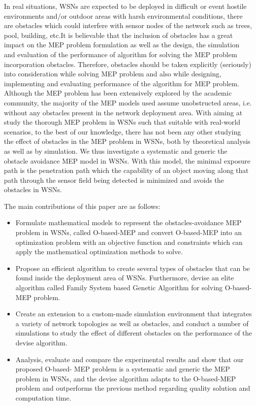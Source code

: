 \documentclass[final]{elsarticle}
\begin{document}
In real situations, WSNs are expected to be deployed in difficult or event hostile environments and/or outdoor areas with harsh environmental conditions, there are obstacles which could interfere with sensor nodes of the network such as trees, pool, building, etc.It is believable that the inclusion of obstacles has a great impact on the MEP problem formulation as well as the design, the simulation and evaluation of the performance of algorithm for solving the MEP problem incorporation obstacles. Therefore, obstacles should be taken explicitly (seriously) into consideration while solving MEP problem and also while designing, implementing and evaluating performance of the algorithm for MEP problem. Although the MEP problem has been extensively explored by the academic community, the majority of the MEP models used assume unobstructed areas, i.e. without any obstacles present in the network deployment area. With aiming at study the thorough MEP problem in WSNs such that suitable with real-world scenarios, to the best of our knowledge, there has not been any other studying the effect of obstacles in the MEP problem in WSNs, both by theoretical analysis as well as by simulation. We thus investigate a systematic and generic the obstacle avoidance MEP model in WSNs. With this model, the minimal exposure path is the penetration path which the capability of an object moving along that path through the sensor field being detected is minimized and avoids the obstacles in WSNs. 

The main contributions of this paper are as follows:
\begin{itemize}
	\itemsep0em
	\item Formulate mathematical models to represent the obstacles-avoidance MEP problem in WSNs, called O-based-MEP and convert O-based-MEP into an optimization problem with an objective function and constraints which can apply the mathematical optimization methods to solve.
	\item Propose an efficient algorithm to create several types of obstacles that can be found inside the deployment area of WSNs. Furthermore, devise an elite algorithm called Family System based Genetic Algorithm for solving O-based-MEP problem. 
	\item Create an extension to a custom-made simulation environment that integrates a variety of network topologies as well as obstacles, and conduct a number of simulations to study the effect of different obstacles on the performance of the devise algorithm. 
	\item Analysis, evaluate and compare the experimental results and show that our proposed O-based- MEP problem is a systematic and generic the MEP problem in WSNs, and the devise algorithm adapts to the O-based-MEP problem and outperforms the previous method regarding quality solution and computation time.	
\end{itemize}
\end{document}
